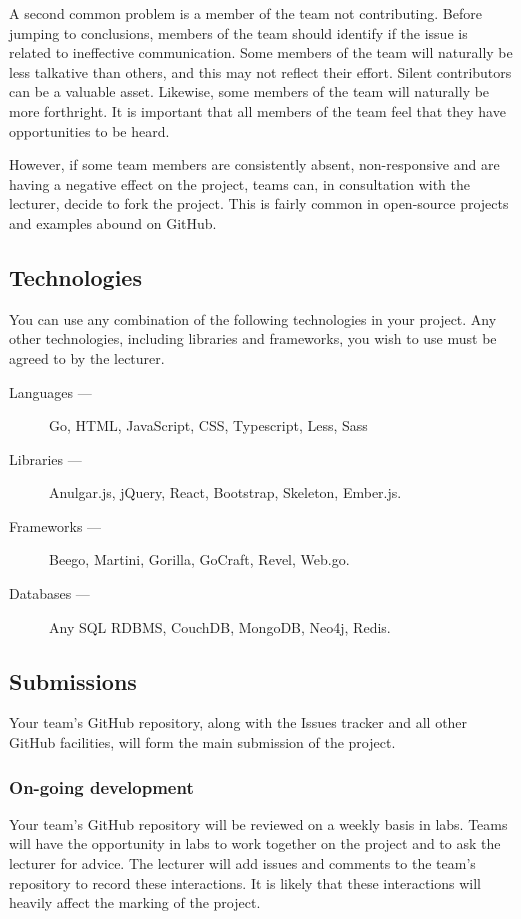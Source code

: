 A second common problem is a member of the team not contributing.
Before jumping to conclusions, members of the team should identify if the issue is related to ineffective communication.
Some members of the team will naturally be less talkative than others, and this may not reflect their effort.
Silent contributors can be a valuable asset.
Likewise, some members of the team will naturally be more forthright.
It is important that all members of the team feel that they have opportunities to be heard.

However, if some team members are consistently absent, non-responsive and are having a negative effect on the project, teams can, in consultation with the lecturer, decide to fork the project.
This is fairly common in open-source projects and examples abound on GitHub.


\subsection*{Technologies}
You can use any combination of the following technologies in your project.
Any other technologies, including libraries and frameworks, you wish to use must be agreed to by the lecturer.

\begin{description}
\item[Languages ---] Go, HTML, JavaScript, CSS, Typescript, Less, Sass
\item[Libraries ---] Anulgar.js, jQuery, React, Bootstrap, Skeleton, Ember.js.
\item[Frameworks ---] Beego, Martini, Gorilla, GoCraft, Revel, Web.go.
\item[Databases ---] Any SQL RDBMS, CouchDB, MongoDB, Neo4j, Redis.
\end{description}

\subsection*{Submissions}
Your team's GitHub repository, along with the Issues tracker and all other GitHub facilities, will form the main submission of the project.

\subsubsection*{On-going development}
Your team's GitHub repository will be reviewed on a weekly basis in labs.
Teams will have the opportunity in labs to work together on the project and to ask the lecturer for advice.
The lecturer will add issues and comments to the team's repository to record these interactions.
It is likely that these interactions will heavily affect the marking of the project.


